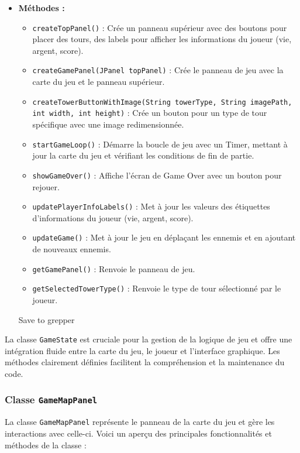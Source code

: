 \documentclass{article}
\begin{document}
\begin{itemize}
\item \textbf{Méthodes :}
\begin{itemize}
    \item \texttt{createTopPanel()} : Crée un panneau supérieur avec des boutons pour placer des tours, des labels pour afficher les informations du joueur (vie, argent, score).
    \item \texttt{createGamePanel(JPanel topPanel)} : Crée le panneau de jeu avec la carte du jeu et le panneau supérieur.
    \item \texttt{createTowerButtonWithImage(String towerType, String imagePath, int width, int height)} : Crée un bouton pour un type de tour spécifique avec une image redimensionnée.
    \item \texttt{startGameLoop()} : Démarre la boucle de jeu avec un Timer, mettant à jour la carte du jeu et vérifiant les conditions de fin de partie.
    \item \texttt{showGameOver()} : Affiche l'écran de Game Over avec un bouton pour rejouer.
    \item \texttt{updatePlayerInfoLabels()} : Met à jour les valeurs des étiquettes d'informations du joueur (vie, argent, score).
    \item \texttt{updateGame()} : Met à jour le jeu en déplaçant les ennemis et en ajoutant de nouveaux ennemis.
    \item \texttt{getGamePanel()} : Renvoie le panneau de jeu.
    \item \texttt{getSelectedTowerType()} : Renvoie le type de tour sélectionné par le joueur.
\end{itemize}
Save to grepper
\end{itemize}

La classe \texttt{GameState} est cruciale pour la gestion de la logique de jeu et offre une intégration fluide entre la carte du jeu, le joueur et l'interface graphique. Les méthodes clairement définies facilitent la compréhension et la maintenance du code.

\subsubsection{Classe \texttt{GameMapPanel}}

La classe \texttt{GameMapPanel} représente le panneau de la carte du jeu et gère les interactions avec celle-ci. Voici un aperçu des principales fonctionnalités et méthodes de la classe :
\end{document}
